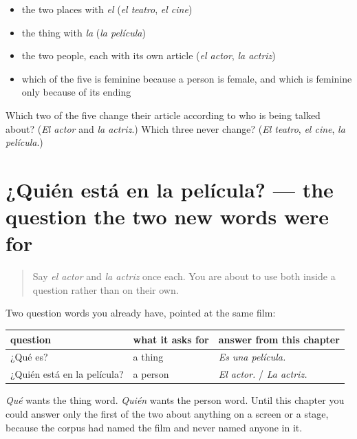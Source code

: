 \begin{itemize}
\raggedright
  \item the two places with \emph{el} (\emph{el teatro}, \emph{el cine})
  \item the thing with \emph{la} (\emph{la película})
  \item the two people, each with its own article (\emph{el actor}, \emph{la actriz})
  \item which of the five is feminine because a person is female, and which is feminine only because of its ending
\end{itemize}

\begin{tcolorbox}[breakable,colback=teal!4,colframe=teal!35!black,title={Before you move on}]
Which two of the five change their article according to who is being talked about? (\emph{El actor} and \emph{la actriz}.) Which three never change? (\emph{El teatro}, \emph{el cine}, \emph{la película}.)
\end{tcolorbox}
\section[¿Quién está en la película?]{¿Quién está en la película? — the question the two new words were for}

\label{lesson:ES-C421-sintesis-espectaculo}



\begin{quote}
Say \emph{el actor} and \emph{la actriz} once each. You are about to use both inside a question rather than on their own.
\end{quote}

\begin{grammarlens}[title={Grammar Lens: naming a person answers a different question}]
Two question words you already have, pointed at the same film:

\noindent
\begin{tabularx}{\linewidth}{@{}>{\raggedright\arraybackslash}X>{\raggedright\arraybackslash}X>{\raggedright\arraybackslash}X@{}}
\toprule
\textbf{question} & \textbf{what it asks for} & \textbf{answer from this chapter} \\
\midrule
¿Qué es? & a thing & \emph{Es una película.} \\
¿Quién está en la película? & a person & \emph{El actor.} / \emph{La actriz.} \\
\bottomrule
\end{tabularx}

\emph{Qué} wants the thing word. \emph{Quién} wants the person word. Until this chapter you could answer only the first of the two about anything on a screen or a stage, because the corpus had named the film and never named anyone in it.
\end{grammarlens}

